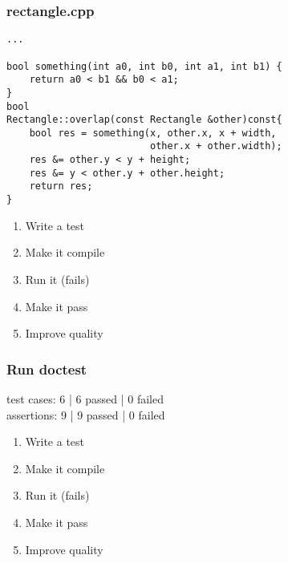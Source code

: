 \begin{frame}[fragile]
\frametitle{rectangle.cpp}
\begin{minipage}[t]{0.48\linewidth}
\begin{lstlisting}
...

bool something(int a0, int b0, int a1, int b1) {
    return a0 < b1 && b0 < a1;
}
bool 
Rectangle::overlap(const Rectangle &other)const{
    bool res = something(x, other.x, x + width, 
                         other.x + other.width);
    res &= other.y < y + height;
    res &= y < other.y + other.height;
    return res;
}
\end{lstlisting}
\end{minipage}\hfill
\begin{minipage}[t]{0.28\linewidth}
  \small
  \begin{enumerate} 
    \item \textcolor{deadcolor}{Write a test}
    \item \textcolor{deadcolor}{Make it compile}
    \item \textcolor{deadcolor}{Run it (fails)}
    \item \textcolor{deadcolor}{Make it pass}
    \item \textcolor{activecolor}{Improve quality}
  \end{enumerate} 
\end{minipage}
\end{frame}

\begin{frame}[fragile]
\frametitle{Run doctest}
\begin{minipage}[t]{0.48\linewidth}
test cases: 6 | 6 passed | 0 failed\\
assertions: 9 | 9 passed | 0 failed\\
\end{minipage}\hfill
\begin{minipage}[t]{0.28\linewidth}
  \small
  \begin{enumerate} 
    \item \textcolor{deadcolor}{Write a test}
    \item \textcolor{deadcolor}{Make it compile}
    \item \textcolor{deadcolor}{Run it (fails)}
    \item \textcolor{deadcolor}{Make it pass}
    \item \textcolor{activecolor}{Improve quality}
  \end{enumerate} 
\end{minipage}
\end{frame}

